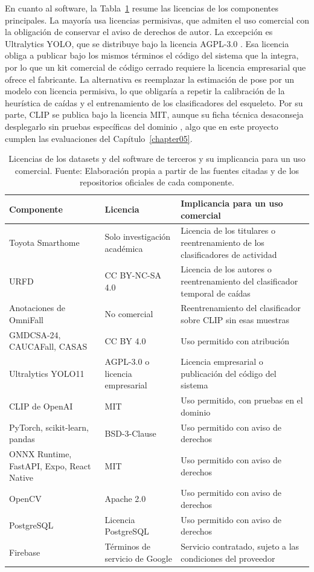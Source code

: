 En cuanto al software, la Tabla~\ref{tab:licencias_software} resume las licencias de los componentes principales.
La mayoría usa licencias permisivas, que admiten el uso comercial con la obligación de conservar el aviso de derechos de autor.
La excepción es Ultralytics YOLO, que se distribuye bajo la licencia AGPL-3.0 \parencite{Ultralytics2026}.
Esa licencia obliga a publicar bajo los mismos términos el código del sistema que la integra, por lo que un kit comercial de código cerrado requiere la licencia empresarial que ofrece el fabricante.
La alternativa es reemplazar la estimación de pose por un modelo con licencia permisiva, lo que obligaría a repetir la calibración de la heurística de caídas y el entrenamiento de los clasificadores del esqueleto.
Por su parte, CLIP se publica bajo la licencia MIT, aunque su ficha técnica desaconseja desplegarlo sin pruebas específicas del dominio \parencite{OpenAI2021}, algo que en este proyecto cumplen las evaluaciones del Capítulo~\ref{chapter05}.

\begin{table}[H]
\centering
\caption[Licencias de los datasets y del software de terceros.]{Licencias de los datasets y del software de terceros y su implicancia para un uso comercial. Fuente: Elaboración propia a partir de las fuentes citadas y de los repositorios oficiales de cada componente.}
\label{tab:licencias_software}
\small
\begin{tabular}{@{}p{3.6cm}p{3.4cm}p{7.4cm}@{}}
\toprule
\textbf{Componente} & \textbf{Licencia} & \textbf{Implicancia para un uso comercial} \\
\midrule
Toyota Smarthome & Solo investigación académica & Licencia de los titulares o reentrenamiento de los clasificadores de actividad \\
URFD & CC BY-NC-SA 4.0 & Licencia de los autores o reentrenamiento del clasificador temporal de caídas \\
Anotaciones de OmniFall & No comercial & Reentrenamiento del clasificador sobre CLIP sin esas muestras \\
GMDCSA-24, CAUCAFall, CASAS & CC BY 4.0 & Uso permitido con atribución \\
Ultralytics YOLO11 & AGPL-3.0 o licencia empresarial & Licencia empresarial o publicación del código del sistema \\
CLIP de OpenAI & MIT & Uso permitido, con pruebas en el dominio \\
PyTorch, scikit-learn, pandas & BSD-3-Clause & Uso permitido con aviso de derechos \\
ONNX Runtime, FastAPI, Expo, React Native & MIT & Uso permitido con aviso de derechos \\
OpenCV & Apache 2.0 & Uso permitido con aviso de derechos \\
PostgreSQL & Licencia PostgreSQL & Uso permitido con aviso de derechos \\
Firebase & Términos de servicio de Google & Servicio contratado, sujeto a las condiciones del proveedor \\
\bottomrule
\end{tabular}
\end{table}

